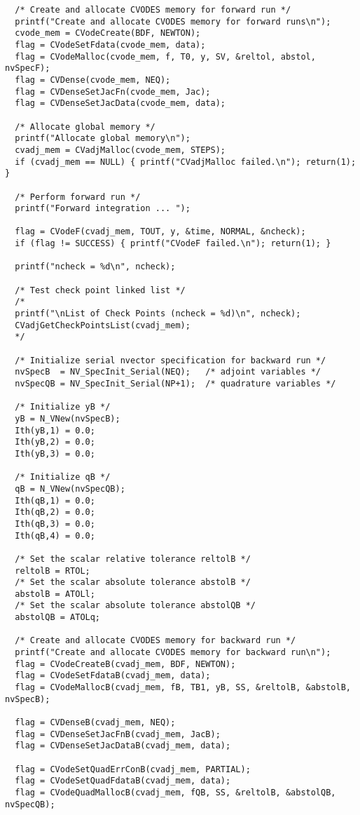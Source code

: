 \begin{verbatim}
  /* Create and allocate CVODES memory for forward run */
  printf("Create and allocate CVODES memory for forward runs\n");
  cvode_mem = CVodeCreate(BDF, NEWTON);
  flag = CVodeSetFdata(cvode_mem, data);
  flag = CVodeMalloc(cvode_mem, f, T0, y, SV, &reltol, abstol, nvSpecF);
  flag = CVDense(cvode_mem, NEQ);
  flag = CVDenseSetJacFn(cvode_mem, Jac);
  flag = CVDenseSetJacData(cvode_mem, data);

  /* Allocate global memory */
  printf("Allocate global memory\n");
  cvadj_mem = CVadjMalloc(cvode_mem, STEPS);
  if (cvadj_mem == NULL) { printf("CVadjMalloc failed.\n"); return(1); }

  /* Perform forward run */
  printf("Forward integration ... ");
  
  flag = CVodeF(cvadj_mem, TOUT, y, &time, NORMAL, &ncheck);
  if (flag != SUCCESS) { printf("CVodeF failed.\n"); return(1); }

  printf("ncheck = %d\n", ncheck);

  /* Test check point linked list */
  /*
  printf("\nList of Check Points (ncheck = %d)\n", ncheck);
  CVadjGetCheckPointsList(cvadj_mem);
  */

  /* Initialize serial nvector specification for backward run */ 
  nvSpecB  = NV_SpecInit_Serial(NEQ);   /* adjoint variables */
  nvSpecQB = NV_SpecInit_Serial(NP+1);  /* quadrature variables */

  /* Initialize yB */
  yB = N_VNew(nvSpecB);
  Ith(yB,1) = 0.0;
  Ith(yB,2) = 0.0;
  Ith(yB,3) = 0.0;

  /* Initialize qB */
  qB = N_VNew(nvSpecQB);
  Ith(qB,1) = 0.0;
  Ith(qB,2) = 0.0;
  Ith(qB,3) = 0.0;
  Ith(qB,4) = 0.0;

  /* Set the scalar relative tolerance reltolB */
  reltolB = RTOL;               
  /* Set the scalar absolute tolerance abstolB */
  abstolB = ATOLl;
  /* Set the scalar absolute tolerance abstolQB */
  abstolQB = ATOLq;

  /* Create and allocate CVODES memory for backward run */
  printf("Create and allocate CVODES memory for backward run\n");
  flag = CVodeCreateB(cvadj_mem, BDF, NEWTON);
  flag = CVodeSetFdataB(cvadj_mem, data);
  flag = CVodeMallocB(cvadj_mem, fB, TB1, yB, SS, &reltolB, &abstolB, nvSpecB);

  flag = CVDenseB(cvadj_mem, NEQ);
  flag = CVDenseSetJacFnB(cvadj_mem, JacB);
  flag = CVDenseSetJacDataB(cvadj_mem, data);

  flag = CVodeSetQuadErrConB(cvadj_mem, PARTIAL);
  flag = CVodeSetQuadFdataB(cvadj_mem, data);
  flag = CVodeQuadMallocB(cvadj_mem, fQB, SS, &reltolB, &abstolQB, nvSpecQB);


\end{verbatim}
